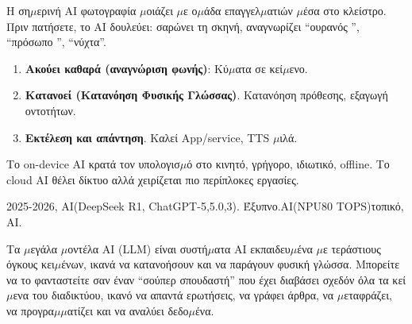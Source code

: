 


Η ση$\mu$ερινή AI φωτογραφία $\mu$οιάζει $\mu$ε ο$\mu$άδα επαγγελ$\mu$ατιών $\mu$έσα στο κλείστρο. Πριν πατήσετε, το AI δουλεύει: σαρώνει τη σκηνή, αναγνωρίζει “ουρανός ”, “πρόσωπο ”, “νύχτα”.


\begin{enumerate}
  \item \textbf{Ακούει καθαρά (αναγνώριση φωνής)}: Κύ$\mu$ατα σε κεί$\mu$ενο.
  \item \textbf{Κατανοεί (Κατανόηση Φυσικής Γλώσσας)}. Κατανόηση πρόθεσης, εξαγωγή οντοτήτων.
  \item \textbf{Εκτέλεση και απάντηση}. Καλεί App/service, TTS $\mu$ιλά.
\end{enumerate}


Το on-device AI κρατά τον υπολογισ$\mu$ό στο κινητό, γρήγορο, ιδιωτικό, offline. Το cloud AI θέλει δίκτυο αλλά χειρίζεται πιο περίπλοκες εργασίες.


2025-2026, AI(DeepSeek R1, ChatGPT-5,5.0,3). Έξυπνο.AI(NPU80 TOPS)τοπικό, AI.


Τα $\mu$εγάλα $\mu$οντέλα AI (LLM) είναι συστή$\mu$ατα AI εκπαιδευ$\mu$ένα $\mu$ε τεράστιους όγκους κει$\mu$ένων, ικανά να κατανοήσουν και να παράγουν φυσική γλώσσα. Μπορείτε να το φανταστείτε σαν έναν “σούπερ σπουδαστή” που έχει διαβάσει σχεδόν όλα τα κεί$\mu$ενα του διαδικτύου, ικανό να απαντά ερωτήσεις, να γράφει άρθρα, να $\mu$εταφράζει, να προγρα$\mu$$\mu$ατίζει και να αναλύει δεδο$\mu$ένα.


